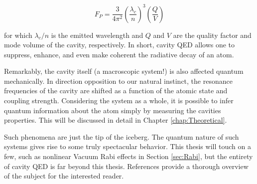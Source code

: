 \documentclass[11 pt, oneside]{book} %
\begin{document}
\begin{equation}
F_P=\frac{3}{4\pi^2}\left(\frac{\lambda_c}{n}\right)^3\left(\frac{Q}{V}\right)
\end{equation}

for which $\lambda_c/n$ is the emitted wavelength and $Q$ and $V$ are the quality factor and mode volume of the cavity, respectively. In short, cavity QED allows one to suppress, enhance, and even make coherent the radiative decay of an atom.

Remarkably, the cavity itself (a macroscopic system!) is also affected quantum mechanically. In direction opposition to our natural instinct, the resonance frequencies of the cavity are shifted as a function of the atomic state and coupling strength. Considering the system as a whole, it is possible to infer quantum information about the atom simply by measuring the cavities properties. This will be discussed in detail in Chapter \ref{chap:Theoretical}. 

Such phenomena are just the tip of the iceberg. The quantum nature of such systems gives rise to some truly spectacular behavior. This thesis will touch on a few, such as nonlinear Vacuum Rabi effects in Section \ref{sec:Rabi}, but the entirety of cavity QED is far beyond this thesis. References \cite{Berman, Dutra} provide a thorough overview of the subject for the interested reader. 




\end{document}
